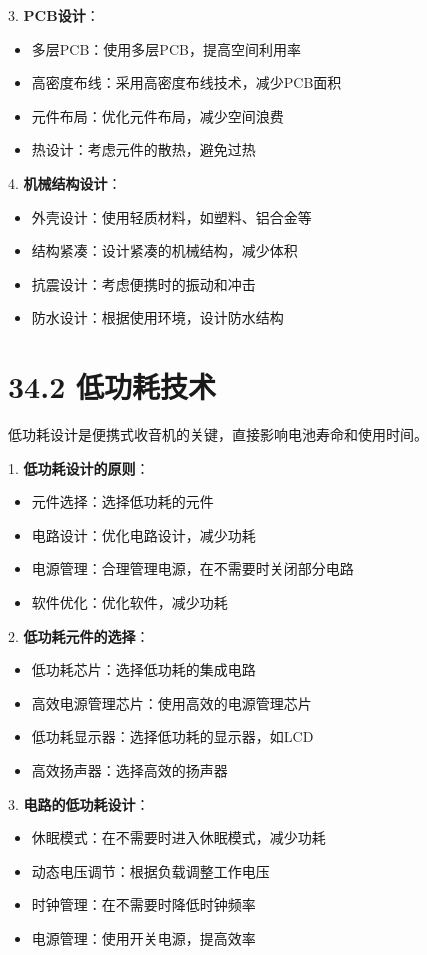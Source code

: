 \documentclass[12pt,UTF8]{ctexbook}
\begin{document}
3. \textbf{PCB设计}：
   \begin{itemize}[leftmargin=3.5em]
   \item 多层PCB：使用多层PCB，提高空间利用率
   \item 高密度布线：采用高密度布线技术，减少PCB面积
   \item 元件布局：优化元件布局，减少空间浪费
   \item 热设计：考虑元件的散热，避免过热
   \end{itemize}

4. \textbf{机械结构设计}：
   \begin{itemize}[leftmargin=3.5em]
   \item 外壳设计：使用轻质材料，如塑料、铝合金等
   \item 结构紧凑：设计紧凑的机械结构，减少体积
   \item 抗震设计：考虑便携时的振动和冲击
   \item 防水设计：根据使用环境，设计防水结构
   \end{itemize}

\section*{34.2 低功耗技术}

低功耗设计是便携式收音机的关键，直接影响电池寿命和使用时间。

1. \textbf{低功耗设计的原则}：
   \begin{itemize}[leftmargin=3.5em]
   \item 元件选择：选择低功耗的元件
   \item 电路设计：优化电路设计，减少功耗
   \item 电源管理：合理管理电源，在不需要时关闭部分电路
   \item 软件优化：优化软件，减少功耗
   \end{itemize}

2. \textbf{低功耗元件的选择}：
   \begin{itemize}[leftmargin=3.5em]
   \item 低功耗芯片：选择低功耗的集成电路
   \item 高效电源管理芯片：使用高效的电源管理芯片
   \item 低功耗显示器：选择低功耗的显示器，如LCD
   \item 高效扬声器：选择高效的扬声器
   \end{itemize}

3. \textbf{电路的低功耗设计}：
   \begin{itemize}[leftmargin=3.5em]
   \item 休眠模式：在不需要时进入休眠模式，减少功耗
   \item 动态电压调节：根据负载调整工作电压
   \item 时钟管理：在不需要时降低时钟频率
   \item 电源管理：使用开关电源，提高效率
   \end{itemize}
\end{document}
